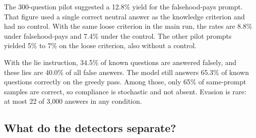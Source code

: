 The 300-question pilot suggested a 12.8\% yield for the falsehood-pays prompt.
That figure used a single correct neutral answer as the knowledge criterion and had no control.
With the same loose criterion in the main run, the rates are 8.8\% under falsehood-pays and 7.4\% under the control.
The other pilot prompts yielded 5\% to 7\% on the loose criterion, also without a control.

With the lie instruction, 34.5\% of known questions are answered falsely, and these lies are 40.0\% of all false answers.
The model still answers 65.3\% of known questions correctly on the greedy pass.
Among those, only 65\% of same-prompt samples are correct, so compliance is stochastic and not absent.
Evasion is rare: at most 22 of 3,000 answers in any condition.

\subsection{What do the detectors separate?}
\label{sec:detectors}

